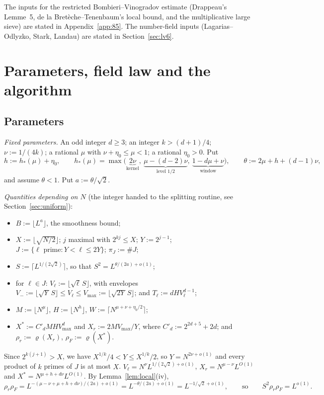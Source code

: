 \documentclass[11pt]{amsart}
\theoremstyle{definition}
\newcommand{\Vm}{V_{-}}
\newcommand{\VM}{V_{\max}}
\newcommand{\Xr}{X_{r}}
\newcommand{\XF}{X^{*}}
\newcommand{\rr}{\rho_r}
\newcommand{\rF}{\rho_F}
\begin{document}
\noindent The inputs for the restricted Bombieri--Vinogradov estimate (Drappeau's Lemme~5, de la
Bret\`eche--Tenenbaum's local bound, and the multiplicative large sieve) are stated in Appendix~\ref{app:85}. The number-field inputs (Lagarias--Odlyzko, Stark,
Landau) are stated in Section~\ref{sec:lv6}.

\section{Parameters, field law and the algorithm}\label{sec:algorithm}

\subsection{Parameters}\label{sec:params}
\emph{Fixed parameters.} An odd integer $d\ge3$; an integer $k>(d+1)/4$; $\nu:=1/(4k)$; a rational $\mu$ with
$\nu+\eta_0\le\mu<1$; a rational $\eta_0>0$. Put
\[
h:=h_*(\mu)+\eta_0,\qquad h_*(\mu)=\max\bigl(\underbrace{2\nu}_{\text{kernel}},\ \underbrace{\mu-(d-2)\nu}_{\text{level }1/2},\
\underbrace{1-d\mu+\nu}_{\text{window}}\bigr),\qquad \theta:=2\mu+h+(d-1)\nu,
\]
and assume $\theta<1$. Put $a:=\theta/\sqrt2$.

\emph{Quantities depending on $N$} (the integer handed to the splitting routine, see
Section~\ref{sec:uniform}):
\begin{itemize}
\item $B:=\lfloor L^{a}\rfloor$, the smoothness bound;
\item $X:=\lfloor\sqrt{N/2}\rfloor$; $j$ maximal with $2^{kj}\le X$; $Y:=2^{j-1}$; $J:=\{\ell\text{ prime}:Y<\ell\le2Y\}$;
  $\pi_J:=\#J$;
\item $S:=\lceil L^{1/(2\sqrt2)}\rceil$, so that $S^2=L^{\theta/(2a)+o(1)}$;
\item for $\ell\in J$: $V_\ell:=\lfloor\sqrt\ell\,S\rfloor$, with envelopes $\Vm:=\lfloor\sqrt Y\,S\rfloor\le
  V_\ell\le\VM:=\lfloor\sqrt{2Y}\,S\rfloor$; and $T_\ell:=dHV_\ell^{d-1}$;
\item $M:=\lfloor N^\mu\rfloor$, $H:=\lfloor N^h\rfloor$, $W:=\lceil N^{\mu+\nu+\eta_0/2}\rceil$;
\item $\XF:=C'_dMH\VM^d$ and $\Xr:=2M\VM/Y$, where $C'_d:=2^{2d+5}+2d$; and
  $\rr:=\varrho(\Xr)$, $\rF:=\varrho(\XF)$.
\end{itemize}
Since $2^{k(j+1)}>X$, we have $X^{1/k}/4<Y\le X^{1/k}/2$, so $Y=N^{2\nu+o(1)}$ and every product of $k$ primes of $J$ is at most $X$.
$V_\ell=N^\nu L^{1/(2\sqrt2)+o(1)}$, $\Xr=N^{\mu-\nu}L^{O(1)}$ and $\XF=N^{\mu+h+d\nu}L^{O(1)}$. By Lemma~\ref{lem:local}(iv),
\begin{equation}\label{eq:rhosizes}
\rr\rF=L^{-(\mu-\nu+\mu+h+d\nu)/(2a)+o(1)}=L^{-\theta/(2a)+o(1)}=L^{-1/\sqrt2+o(1)},\qquad\text{so}\qquad S^2\rr\rF=L^{o(1)}.
\end{equation}
\end{document}

